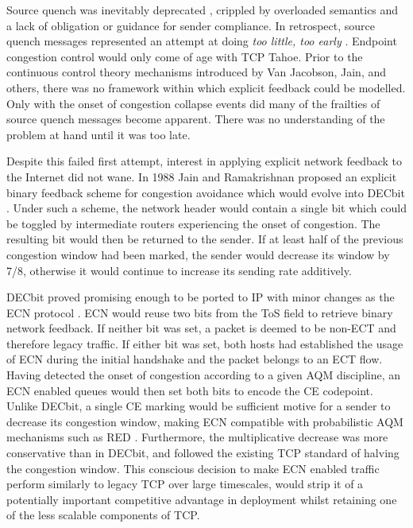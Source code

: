 Source quench was inevitably deprecated \cite{Baker:1995p479}, crippled by overloaded semantics and a lack of obligation or guidance for sender compliance.
In retrospect, source quench messages represented an attempt at doing \emph{too little, too early} \cite{Crowcroft:2003p450}.
Endpoint congestion control would only come of age with TCP Tahoe.
Prior to the continuous control theory mechanisms introduced by Van Jacobson, Jain, and others, there was no framework within which explicit feedback could be modelled.
Only with the onset of congestion collapse events did many of the frailties of source quench messages become apparent.
There was no understanding of the problem at hand until it was too late.

Despite this failed first attempt, interest in applying explicit network feedback to the Internet did not wane.
In 1988 Jain and Ramakrishnan proposed an explicit binary feedback scheme for congestion avoidance which would evolve into DECbit \cite{Ramakrishnan:1990p456}.
Under such a scheme, the network header would contain a single bit which could be toggled by intermediate routers experiencing the onset of congestion.
The resulting bit would then be returned to the sender.
If at least half of the previous congestion window had been marked, the sender would decrease its window by 7/8, otherwise it would continue to increase its sending rate additively.

DECbit proved promising enough to be ported to \ac{IP} with minor changes as the \ac{ECN} protocol \cite{Floyd:1994p491}.
\ac{ECN} would reuse two bits from the \ac{ToS} field to retrieve binary network feedback.
If neither bit was set, a packet is deemed to be non-\ac{ECT} and therefore legacy traffic.
If either bit was set, both hosts had established the usage of \ac{ECN} during the initial handshake and the packet belongs to an \ac{ECT} flow.
Having detected the onset of congestion according to a given \ac{AQM} discipline, an \ac{ECN} enabled queues would then set both bits to encode the \ac{CE} codepoint.
Unlike DECbit, a single \ac{CE} marking would be sufficient motive for a sender to decrease its congestion window, making \ac{ECN} compatible with probabilistic \ac{AQM} mechanisms such as \ac{RED} \cite{Floyd:1993p492}.
Furthermore, the multiplicative decrease was more conservative than in DECbit, and followed the existing \ac{TCP} standard of halving the congestion window.
This conscious decision to make \ac{ECN} enabled traffic perform similarly to legacy \ac{TCP} over large timescales, would strip it of a potentially important competitive advantage in deployment whilst retaining one of the less scalable components of \ac{TCP}.

